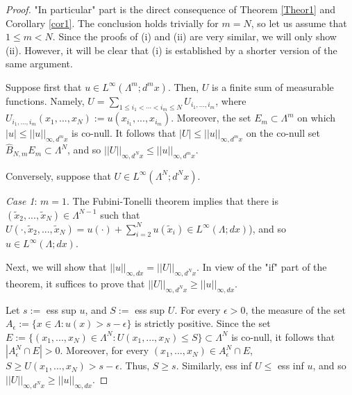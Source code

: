 \documentclass[12pt,leqno]{amsart}
\numberwithin{equation}{section}
\numberwithin{theor}{section}
\numberwithin{rem}{section}
\begin{document}
\begin{proof}
"In particular" part is the direct consequence of Theorem \ref{Theor1} and Corollary \ref{cor1}.
The conclusion holds trivially for $m=N$, so let us assume that $1\leq m<N$.  Since the proofs of (i) and (ii) are very 
similar, we will only show (ii).  However, it will be clear that (i) 
is established by a shorter version of the same argument.    
 
Suppose first that $u\in L^{\infty}(\Lambda^m; d^{m}x)$.    Then, $U$ is a finite sum of measurable functions.  
Namely, $U=\sum_{1\leq i_1<\cdots<i_m\leq N} 
U_{i_1,...,i_m}$, where $U_{i_1,...,i_m}(x_1,...,x_N):=
u(x_{i_1},...,x_{i_m})$.  Moreover, the set 
$E_m\subset\Lambda^m$ on which $| u | \leq || u ||_{\infty,d^{m}x}$ is co-null.  It follows that $\left | U \right | \leq || u ||_{\infty,d^{m}x} $
on the co-null set $\hat{B}_{N,m} E_m\subset \Lambda^N$, and so  $\left |\left | U \right |\right |_{\infty,d^{N}x} \leq 
|| u ||_{\infty,d^{m}x} $.

Conversely, suppose that $U\in L^{\infty}(\Lambda^N; d^{N}x)$.  
\newline

\textit{Case 1}:  $m=1$.  The Fubini-Tonelli 
theorem implies that there is $(\tilde{x}_2,...,\tilde{x}_N)\in \Lambda^{N-1}$ 
such that $U(\cdot,\tilde{x}_2,...,\tilde{x}_N)=u(\cdot) + 
\sum_{i=2}^{N} u(\tilde{x}_i)\in L^{\infty}(\Lambda; dx)$), and so $u\in L^{\infty}(\Lambda; dx)$. 

Next, we will show that $|| u ||_{\infty,dx}=\left | \left | U 
\right |\right |_{\infty,d^{N}x} $.  In view of the "if" part of the theorem, it suffices to prove that $\left | \left | U \right |\right |_{\infty,d^{N}x} \geq || u ||_{\infty,dx}$.  

Let $s:=$ ess sup $u $, and $S:=$ ess sup $U $.
For every 
$\epsilon>0$, the measure of the set $A_{\epsilon}:=\{x\in\Lambda : u(x)>s-\epsilon\}$ is strictly positive.  Since the 
set $E:=\{(x_1,...,x_N)\in\Lambda^N: U(x_1,...,x_N)\leq S\}
\subset \Lambda^N$ is co-null, it follows that $\left | A_{\epsilon}^N\cap E\right |>0$.  Moreover, for every 
$(x_1,...,x_N)\in A_{\epsilon}^N\cap E$, 
$S\geq U(x_1,...,x_N) > s-\epsilon$.  Thus, $S\geq s$.  Similarly, 
ess inf $U\leq$ ess inf $u$, and so $\left | \left | U \right |\right |_{\infty,d^{N}x} \geq || u ||_{\infty,dx}$.
 

\end{proof}
\end{document}
